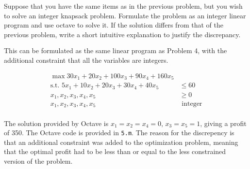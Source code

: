 \documentclass[fleqn]{homework}
\begin{document}
  \begin{problem}{5}
    \begin{question}
      Suppose that you have the same items as in the previous problem, but you
      wish to solve an integer knapsack problem.  Formulate the problem as an
      integer linear program and use octave to solve it.  If the solution
      differs from that of the previous problem, write a short intuitive
      explanation to justify the discrepancy.
    \end{question}

    This can be formulated as the same linear program as Problem 4, with the
    additional constraint that all the variables are integers.

    \begin{align*}
      \max 30x_1 + 20x_2 + 100x_3 + 90x_4 + 160 x_5 &\\
      \text{s.t. } 5x_1 + 10x_2 + 20 x_3 + 30x_4 + 40x_5 &\leq 60 \\
      x_1, x_2, x_3, x_4, x_5 &\geq 0 \\
      x_1, x_2, x_3, x_4, x_5 &\text{ integer} \\
    \end{align*}

    The solution provided by Octave is $x_1 = x_2 = x_4 = 0$, $x_3 = x_5 = 1$,
    giving a profit of 350.  The Octave code is provided in \texttt{5.m}.  The
    reason for the discrepency is that an additional constraint was added to the
    optimization problem, meaning that the optimal profit had to be less than or
    equal to the less constrained version of the problem.
  \end{problem}
\end{document}
